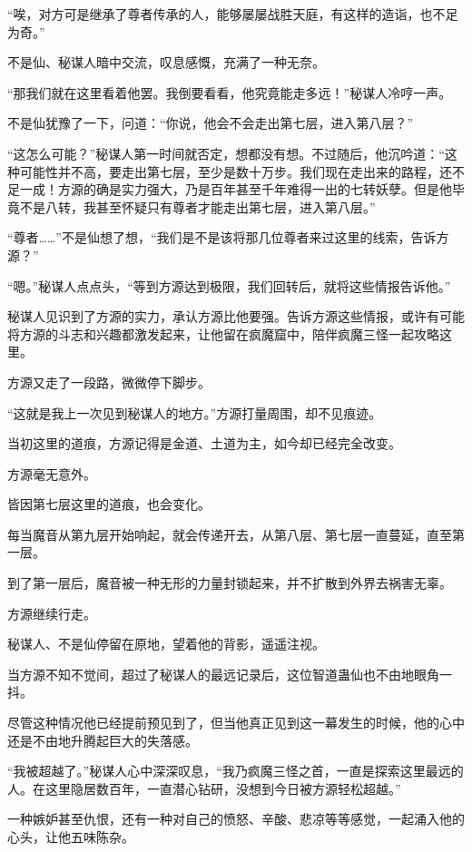 \begin{this_body}
“唉，对方可是继承了尊者传承的人，能够屡屡战胜天庭，有这样的造诣，也不足为奇。”

不是仙、秘谋人暗中交流，叹息感慨，充满了一种无奈。

“那我们就在这里看着他罢。我倒要看看，他究竟能走多远！”秘谋人冷哼一声。

不是仙犹豫了一下，问道：“你说，他会不会走出第七层，进入第八层？”

“这怎么可能？”秘谋人第一时间就否定，想都没有想。不过随后，他沉吟道：“这种可能性并不高，要走出第七层，至少是数十万步。我们现在走出来的路程，还不足一成！方源的确是实力强大，乃是百年甚至千年难得一出的七转妖孽。但是他毕竟不是八转，我甚至怀疑只有尊者才能走出第七层，进入第八层。”

“尊者……”不是仙想了想，“我们是不是该将那几位尊者来过这里的线索，告诉方源？”

“嗯。”秘谋人点点头，“等到方源达到极限，我们回转后，就将这些情报告诉他。”

秘谋人见识到了方源的实力，承认方源比他要强。告诉方源这些情报，或许有可能将方源的斗志和兴趣都激发起来，让他留在疯魔窟中，陪伴疯魔三怪一起攻略这里。

方源又走了一段路，微微停下脚步。

“这就是我上一次见到秘谋人的地方。”方源打量周围，却不见痕迹。

当初这里的道痕，方源记得是金道、土道为主，如今却已经完全改变。

方源毫无意外。

皆因第七层这里的道痕，也会变化。

每当魔音从第九层开始响起，就会传递开去，从第八层、第七层一直蔓延，直至第一层。

到了第一层后，魔音被一种无形的力量封锁起来，并不扩散到外界去祸害无辜。

方源继续行走。

秘谋人、不是仙停留在原地，望着他的背影，遥遥注视。

当方源不知不觉间，超过了秘谋人的最远记录后，这位智道蛊仙也不由地眼角一抖。

尽管这种情况他已经提前预见到了，但当他真正见到这一幕发生的时候，他的心中还是不由地升腾起巨大的失落感。

“我被超越了。”秘谋人心中深深叹息，“我乃疯魔三怪之首，一直是探索这里最远的人。在这里隐居数百年，一直潜心钻研，没想到今日被方源轻松超越。”

一种嫉妒甚至仇恨，还有一种对自己的愤怒、辛酸、悲凉等等感觉，一起涌入他的心头，让他五味陈杂。


\end{this_body}
